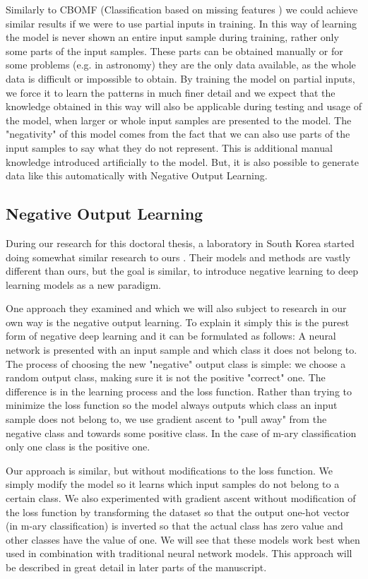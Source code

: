 \documentclass[b5paper]{book}
\let\cite\parencite
\begin{document}
Similarly to CBOMF (Classification based on missing features \cite{milovsevic2019classification}) we could achieve similar results if we were to use partial inputs in training. In this way of learning the model is never shown an entire input sample during training, rather only some parts of the input samples. These parts can be obtained manually or for some problems (e.g. in astronomy) they are the only data available, as the whole data is difficult or impossible to obtain. By training the model on partial inputs, we force it to learn the patterns in much finer detail and we expect that the knowledge obtained in this way will also be applicable during testing and usage of the model, when larger or whole input samples are presented to the model. The "negativity" of this model comes from the fact that we can also use parts of the input samples to say what they do not represent. This is additional manual knowledge introduced artificially to the model. But, it is also possible to generate data like this automatically with Negative Output Learning.

\subsection{Negative Output Learning}

During our research for this doctoral thesis, a laboratory in South Korea started doing somewhat similar research to ours \cite{kim2019nlnl}. Their models and methods are vastly different than ours, but the goal is similar, to introduce negative learning to deep learning models as a new paradigm. 

One approach they examined and which we will also subject to research in our own way is the negative output learning. To explain it simply this is the purest form of negative deep learning and it can be formulated as follows: A neural network is presented with an input sample and which class it does not belong to. The process of choosing the new "negative" output class is simple: we choose a random output class, making sure it is not the positive "correct" one. The difference is in the learning process and the loss function. Rather than trying to minimize the loss function so the model always outputs which class an input sample does not belong to, we use gradient ascent to "pull away" from the negative class and towards some positive class. In the case of m-ary classification only one class is the positive one.

Our approach is similar, but without modifications to the loss function. We simply modify the model so it learns which input samples do not belong to a certain class. We also experimented with gradient ascent without modification of the loss function by transforming the dataset so that the output one-hot vector (in m-ary classification) is inverted so that the actual class has zero value and other classes have the value of one. We will see that these models work best when used in combination with traditional neural network models. This approach will be described in great detail in later parts of the manuscript.
\end{document}
